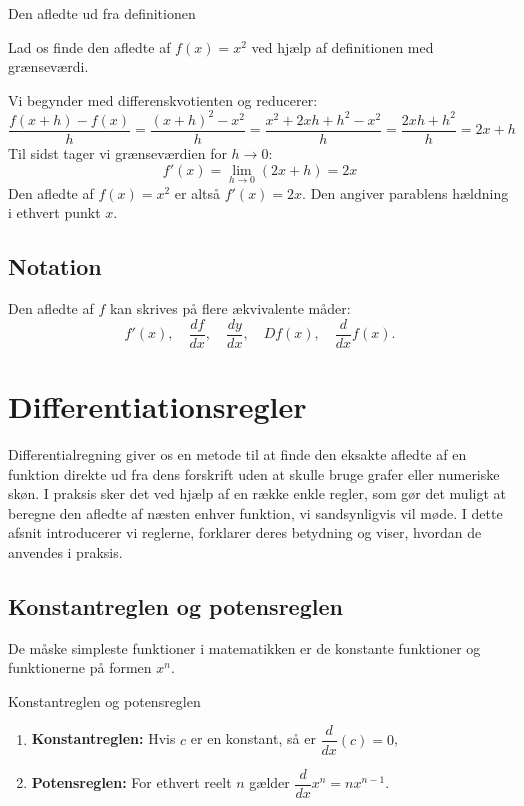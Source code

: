     \begin{example} Den afledte ud fra definitionen
        
    Lad os finde den afledte af \( f(x) = x^2 \) ved hjælp af definitionen med grænseværdi.
    \end{example}
    \begin{solution}
    Vi begynder med differenskvotienten og reducerer:
    \[
    \frac{f(x+h) - f(x)}{h} = \frac{(x+h)^2 - x^2}{h} = \frac{x^2 + 2xh + h^2 - x^2}{h} = \frac{2xh + h^2}{h} = 2x + h
    \]
    Til sidst tager vi grænseværdien for \( h \to 0 \):
    \[
    f'(x) = \lim_{h \to 0} (2x + h) = 2x
    \]
    Den afledte af \( f(x) = x^2 \) er altså \( f'(x) = 2x \). Den angiver parablens hældning i ethvert punkt \(x\).
    \end{solution}

\subsection*{Notation}
Den afledte af $f$ kan skrives på flere ækvivalente måder:
\[
f'(x), \quad \frac{df}{dx}, \quad \frac{dy}{dx}, \quad Df(x), \quad \frac{d}{dx}f(x).
\]

\section{Differentiationsregler}
\label{sec:ch10-rules}

Differentialregning giver os en metode til at finde den eksakte afledte af en funktion direkte ud fra dens forskrift uden at skulle bruge grafer eller numeriske skøn. I praksis sker det ved hjælp af en række enkle regler, som gør det muligt at beregne den afledte af næsten enhver funktion, vi sandsynligvis vil møde. I dette afsnit introducerer vi reglerne, forklarer deres betydning og viser, hvordan de anvendes i praksis.


\subsection*{Konstantreglen og potensreglen}
De måske simpleste funktioner i matematikken er de konstante funktioner og funktionerne på formen $x^{n}$.\\

\begin{theorem}{Konstantreglen og potensreglen}
    \begin{enumerate}
        \item \textbf{Konstantreglen:} Hvis $c$ er en konstant, så er $\dfrac{d}{dx}(c) = 0$, \vspace{0.5em}
        \item \textbf{Potensreglen:} For ethvert reelt $n$ gælder $\dfrac{d}{dx}x^n = n x^{n - 1}$. \vspace{0.5em}
    \end{enumerate}
\end{theorem}

